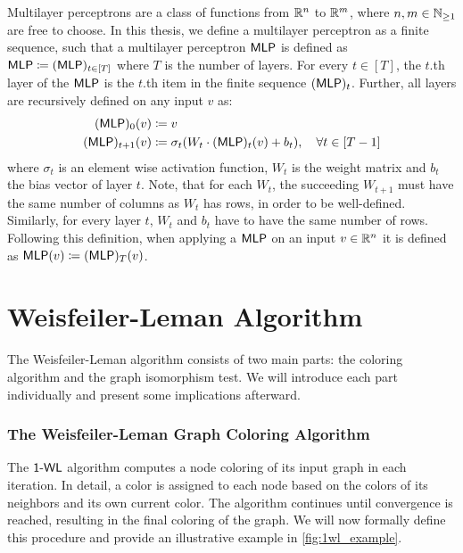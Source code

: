 \begin{definition}\label{def:mlp}
    Multilayer perceptrons are a class of functions from $\mathbb{R}^n$ to $\mathbb{R}^m$, where $n,m \in \mathbb{N}_{\geq 1}$ are free to choose. In this thesis, we define a multilayer perceptron as a finite sequence, such that a multilayer perceptron $\textsf{MLP}$ is defined as $\textsf{MLP} \coloneqq (\textsf{MLP})_{t\in[T]}$ where $T$ is the number of layers. For every $t \in [T]$, the $t$.th layer of the $\textsf{MLP}$ is the $t$.th item in the finite sequence $(\textsf{MLP})_t$. Further, all layers are recursively defined on any input $v$ as:
    \begin{align*}
        (\textsf{MLP})_{0}(v) &\coloneqq v\\
        (\textsf{MLP})_{t+1}(v) &\coloneqq \sigma_t(W_t \cdot (\textsf{MLP})_{t} (v) + b_t), \quad \forall t \in [T-1]
    \end{align*}
    where $\sigma_t$ is an element wise activation function, $W_t$ is the weight matrix and $b_t$ the bias vector of layer $t$. Note, that for each $W_t$, the succeeding $W_{t+1}$ must have the same number of columns as $W_t$ has rows, in order to be well-defined. Similarly, for every layer $t$, $W_t$ and $b_t$ have to have the same number of rows.
    Following this definition, when applying a $\textsf{MLP}$ on an input $v \in \mathbb{R}^n$ it is defined as $\textsf{MLP}(v) \coloneqq (\textsf{MLP})_T(v)$.
\end{definition}

\section{Weisfeiler-Leman Algorithm}\label{sec:1-WL Definition}
The Weisfeiler-Leman algorithm consists of two main parts: the coloring algorithm and the graph isomorphism test. We will introduce each part individually and present some implications afterward.

\subsubsection{The Weisfeiler-Leman Graph Coloring Algorithm}
The $\textsf{1-WL}$ algorithm computes a node coloring of its input graph in each iteration. In detail, a color is assigned to each node based on the colors of its neighbors and its own current color. The algorithm continues until convergence is reached, resulting in the final coloring of the graph. We will now formally define this procedure and provide an illustrative example in \cref{fig:1wl_example}.

